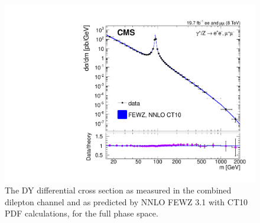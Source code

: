 \begin{figure}[p]
    \centering
    \includegraphics[height=0.3\textheight]{figures/ss-inclboson-drellyan-cms8tev}
    \caption{The DY differential cross section as measured in the combined
dilepton channel and as predicted by NNLO FEWZ 3.1 with CT10 PDF
calculations, for the full phase space.}
    \label{fig:ss-inclboson-drellyan-cms8tev}
\end{figure}
